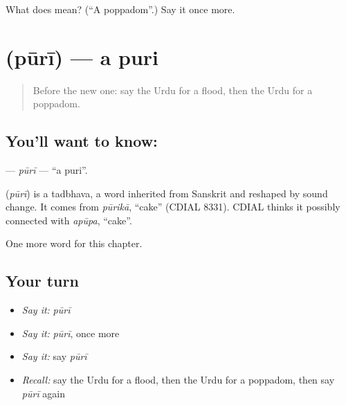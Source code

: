 \begin{tcolorbox}[breakable,colback=teal!4,colframe=teal!35!black,title={Before you move on}]
What does  mean? (\textquotedblleft{}A poppadom\textquotedblright{}.) Say it once more.
\end{tcolorbox}
\section[\texorpdfstring{\ur{پوری} (pūrī)}{پوری (pūrī)}]{ (pūrī) — a puri}

\label{lesson:UR-C234-puri}



\begin{quote}
Before the new one: say the Urdu for a flood, then the Urdu for a poppadom.
\end{quote}

\subsection*{You'll want to know: }
\textbf{} — \emph{pūrī} — \textquotedblleft{}a puri\textquotedblright{}.

\begin{cousinweb}
\textbf{} (\emph{pūrī}) is a tadbhava, a word inherited from Sanskrit and reshaped by sound change. It comes from \emph{pūrikā}, \textquotedblleft{}cake\textquotedblright{} (CDIAL 8331). CDIAL thinks it possibly connected with \emph{apūpa}, \textquotedblleft{}cake\textquotedblright{}.
\end{cousinweb}

\begin{grammarlens}[title={What you've built}]
One more word for this chapter.
\end{grammarlens}

\subsection*{Your turn}
\begin{itemize}
\raggedright
  \item \emph{Say it:} \emph{pūrī}
  \item \emph{Say it:} \emph{pūrī}, once more
  \item \emph{Say it:} say \emph{pūrī}
  \item \emph{Recall:} say the Urdu for a flood, then the Urdu for a poppadom, then say \emph{pūrī} again
\end{itemize}

